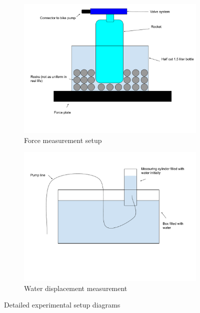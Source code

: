 \documentclass[12pt,a4paper]{article}
\begin{document}
\begin{figure}[H]
\centering
\begin{subfigure}{0.45\textwidth}
    \centering
    \includegraphics[width=\textwidth]{measuring force.pdf}
    \caption{Force measurement setup}
    \label{fig:force_setup_appendix}
\end{subfigure}
\hfill
\begin{subfigure}{0.45\textwidth}
    \centering
    \includegraphics[width=\textwidth]{measuring the water displacement.pdf}
    \caption{Water displacement measurement}
    \label{fig:water_setup_appendix}
\end{subfigure}
\caption{Detailed experimental setup diagrams}
\label{fig:setup_diagrams_appendix}
\end{figure}
\end{document}
